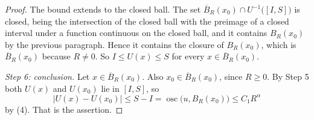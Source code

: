 \begin{proof}
The bound extends to the closed ball.  The set
$\overline B_R(x_0)\cap U^{-1}\bigl([I,S]\bigr)$ is closed, being the
intersection of the closed ball with the preimage of a closed interval under a
function continuous on the closed ball, and it contains $B_R(x_0)$ by the
previous paragraph.  Hence it contains the closure of $B_R(x_0)$, which is
$\overline B_R(x_0)$ because $R\ne0$.  So $I\le U(x)\le S$ for every
$x\in\overline B_R(x_0)$.

\emph{Step 6: conclusion.}  Let $x\in\overline B_R(x_0)$.  Also
$x_0\in\overline B_R(x_0)$, since $R\ge0$.  By Step 5 both $U(x)$ and $U(x_0)$
lie in $[I,S]$, so
\[
|U(x)-U(x_0)|\le S-I=\operatorname*{osc}\bigl(u,B_R(x_0)\bigr)\le C_1R^{\alpha}
\]
by (4).  That is the assertion.
\end{proof}
